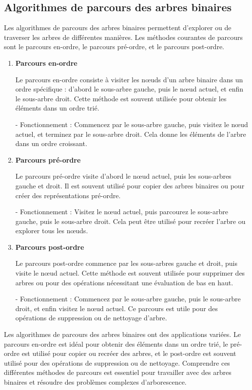 \subsection{Algorithmes de parcours des arbres binaires}

Les algorithmes de parcours des arbres binaires permettent d'explorer ou de traverser les arbres de différentes manières. Les méthodes courantes de parcours sont le parcours en-ordre, le parcours pré-ordre, et le parcours post-ordre.

\begin{enumerate}[label=\alph*)]
	\item \textbf{Parcours en-ordre}
	
	Le parcours en-ordre consiste à visiter les nœuds d'un arbre binaire dans un ordre spécifique : d'abord le sous-arbre gauche, puis le nœud actuel, et enfin le sous-arbre droit. Cette méthode est souvent utilisée pour obtenir les éléments dans un ordre trié.
	
	- Fonctionnement : Commencez par le sous-arbre gauche, puis visitez le nœud actuel, et terminez par le sous-arbre droit. Cela donne les éléments de l'arbre dans un ordre croissant.
	
	\item \textbf{Parcours pré-ordre}
	
	Le parcours pré-ordre visite d'abord le nœud actuel, puis les sous-arbres gauche et droit. Il est souvent utilisé pour copier des arbres binaires ou pour créer des représentations pré-ordre.
	
	- Fonctionnement : Visitez le nœud actuel, puis parcourez le sous-arbre gauche, puis le sous-arbre droit. Cela peut être utilisé pour recréer l'arbre ou explorer tous les nœuds.
	
	\item \textbf{Parcours post-ordre}
	
	Le parcours post-ordre commence par les sous-arbres gauche et droit, puis visite le nœud actuel. Cette méthode est souvent utilisée pour supprimer des arbres ou pour des opérations nécessitant une évaluation de bas en haut.
	
	- Fonctionnement : Commencez par le sous-arbre gauche, puis le sous-arbre droit, et enfin visitez le nœud actuel. Ce parcours est utile pour des opérations de suppression ou de nettoyage d'arbre.
	
\end{enumerate}

Les algorithmes de parcours des arbres binaires ont des applications variées. Le parcours en-ordre est idéal pour obtenir des éléments dans un ordre trié, le pré-ordre est utilisé pour copier ou recréer des arbres, et le post-ordre est souvent utilisé pour des opérations de suppression ou de nettoyage. Comprendre ces différentes méthodes de parcours est essentiel pour travailler avec des arbres binaires et résoudre des problèmes complexes d'arborescence.



